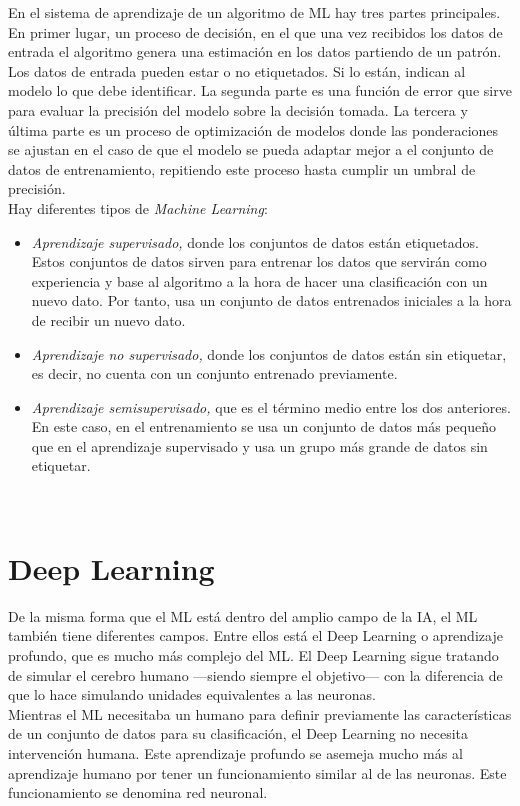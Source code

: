 En el sistema de aprendizaje de un algoritmo de ML hay tres partes principales. En primer lugar, un proceso de decisión, en el que una vez recibidos los datos de entrada el algoritmo genera una estimación en los datos partiendo de un patrón. Los datos de entrada pueden estar o no etiquetados. Si lo están, indican al modelo lo que debe identificar. La segunda parte es una función de error que sirve para evaluar la precisión del modelo sobre la decisión tomada. La tercera y última parte es un proceso de optimización de modelos donde las ponderaciones se ajustan en el caso de que el modelo se pueda adaptar mejor a el conjunto de datos de entrenamiento, repitiendo este proceso hasta cumplir un umbral de precisión.\\

Hay diferentes tipos de \textit{Machine Learning}:
\begin{itemize}
 \item \textit{Aprendizaje supervisado,} donde los conjuntos de datos están etiquetados. Estos conjuntos de datos sirven para entrenar los datos que servirán como experiencia y base al algoritmo a la hora de hacer una clasificación con un nuevo dato. Por tanto, usa un conjunto de datos entrenados iniciales a la hora de recibir un nuevo dato.
 \item \textit{Aprendizaje no supervisado,} donde los conjuntos de datos están sin etiquetar, es decir, no cuenta con un conjunto entrenado previamente.
 \item \textit{Aprendizaje semisupervisado,} que es el término medio entre los dos anteriores. En este caso, en el entrenamiento se usa un conjunto de datos más pequeño que en el aprendizaje supervisado y usa un grupo más grande de datos sin etiquetar.
\end{itemize}\

\section{Deep Learning}
De la misma forma que el ML está dentro del amplio campo de la IA, el ML también tiene diferentes campos. Entre ellos está el Deep Learning o aprendizaje profundo, que es mucho más complejo del ML. El Deep Learning sigue tratando de simular el cerebro humano ---siendo siempre el objetivo--- con la diferencia de que lo hace simulando unidades equivalentes a las neuronas.\\

Mientras el ML necesitaba un humano para definir previamente las características de un conjunto de datos para su clasificación, el Deep Learning no necesita intervención humana. Este aprendizaje profundo se asemeja mucho más al aprendizaje humano por tener un funcionamiento similar al de las neuronas. Este funcionamiento se denomina red neuronal.\\

